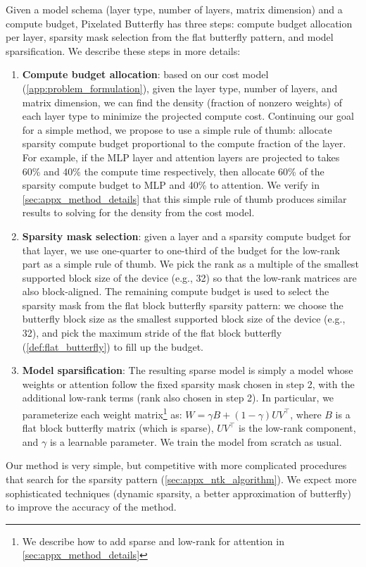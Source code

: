 Given a model schema (layer type, number of layers, matrix dimension) and a
compute budget, Pixelated Butterfly has three steps: compute budget allocation per layer,
sparsity mask selection from the flat butterfly pattern, and model
sparsification.
We describe these steps in more details:
\begin{enumerate}[leftmargin=*,nosep,nolistsep]
  \item \textbf{Compute budget allocation}: based on our cost model
  (\cref{app:problem_formulation}), given the layer type, number of layers, and
  matrix dimension, we can find the density (fraction of nonzero weights) of
  each layer type to minimize the projected compute cost.
  Continuing our goal for a simple method, we propose to use a simple rule of
  thumb: allocate sparsity compute budget proportional to the compute fraction
  of the layer.
  For example, if the MLP layer and attention layers are projected to takes 60\%
  and 40\% the compute time respectively, then allocate 60\% of the sparsity compute budget
  to MLP and 40\% to attention.
  We verify in \cref{sec:appx_method_details} that this simple rule of thumb
  produces similar results to solving for the density from the cost model.

  \item \textbf{Sparsity mask selection}: given a layer and a sparsity compute budget for
  that layer, we use one-quarter to one-third of the budget for the low-rank
  part as a simple rule of thumb.
  We pick the rank as a multiple of the smallest supported block
  size of the device (e.g., 32) so that the low-rank matrices are also block-aligned.
  The remaining compute budget is used to select the sparsity mask from the flat
  block butterfly sparsity pattern: we choose the butterfly block size as the
  smallest supported block size of the device (e.g., 32), and pick the maximum
  stride of the flat block butterfly (\cref{def:flat_butterfly}) to fill up the
  budget.

  \item \textbf{Model sparsification}: The resulting sparse model is simply a
  model whose weights or attention follow the fixed sparsity mask chosen in
  step 2, with the additional low-rank terms (rank also chosen in step 2).
  In particular, we parameterize each weight matrix\footnote{We describe how
  to add sparse and low-rank for attention in \cref{sec:appx_method_details}} as:
  $W = \gamma B + (1 - \gamma) U V^\top$, where $B$ is a flat block butterfly
  matrix (which is sparse), $U V^\top$ is the low-rank component, and $\gamma$
  is a learnable parameter.
  We train the model from scratch as usual.
\end{enumerate}

Our method is very simple, but competitive with more complicated procedures that
search for the sparsity pattern (\cref{sec:appx_ntk_algorithm}).
We expect more sophisticated techniques (dynamic sparsity, a better approximation
of butterfly) to improve the accuracy of the method.


